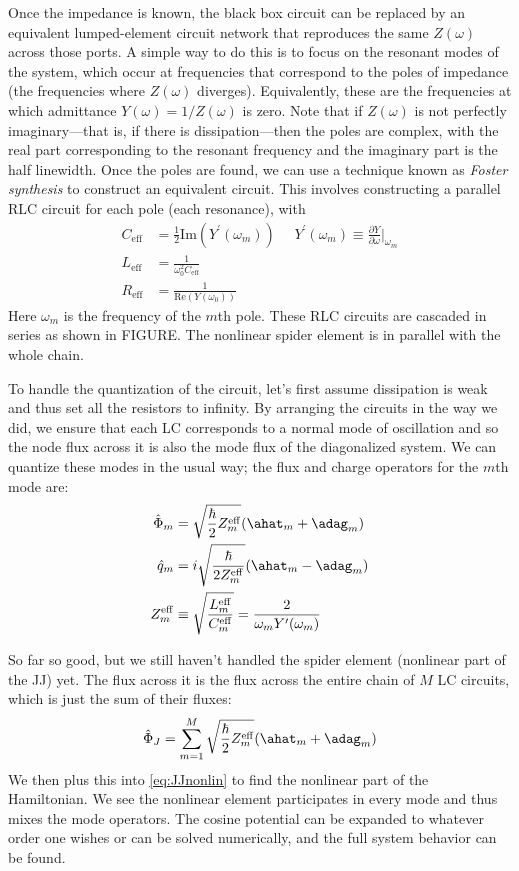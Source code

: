 Once the impedance is known, the black box circuit can be replaced by an equivalent lumped-element circuit network that reproduces the same $Z(\omega)$ across those ports. A simple way to do this is to focus on the resonant modes of the system, which occur at frequencies that correspond to the poles of impedance (the frequencies where $Z(\omega)$ diverges). Equivalently, these are the frequencies at which admittance $Y(\omega) = 1/Z(\omega)$ is zero. Note that if $Z(\omega)$ is not perfectly imaginary---that is, if there is dissipation---then the poles are complex, with the real part corresponding to the resonant frequency and the imaginary part is the half linewidth. Once the poles are found, we can use a technique known as \textit{Foster synthesis} to construct an equivalent circuit. This involves constructing a parallel RLC circuit for each pole (each resonance), with 
\begin{align*}
	C_\mathrm{eff} &= \frac{1}{2} \mathrm{Im}(Y^\prime(\omega_m)) \ \ \ \ \ \ Y^\prime(\omega_m)\equiv \frac{\partial Y}{\partial \omega}\bigg\rvert_{\omega_{m}} \\
	L_\mathrm{eff} &= \frac{1}{\omega_0^2 C_\mathrm{eff}} \\
	R_\mathrm{eff} &= \frac{1}{\mathrm{Re}(Y(\omega_0))}
\end{align*}
Here $\omega_m$ is the frequency of the $m$th pole. These RLC circuits are cascaded in series as shown in FIGURE. The nonlinear spider element is in parallel with the whole chain. 

To handle the quantization of the circuit, let's first assume dissipation is weak and thus set all the resistors to infinity. By arranging the circuits in the way we did, we ensure that each LC corresponds to a normal mode of oscillation and so the node flux across it is also the mode flux of the diagonalized system. We can quantize these modes in the usual way; the flux and charge operators for the $m$th mode are:
\begin{align*}
	\hat{\Phi}_m &= \sqrt{\frac{\hbar}{2} Z^\mathrm{eff}_m} (\ahat_m+\adag_m) \\
	\hat{q}_m &= i\sqrt{\frac{\hbar}{2 Z^\mathrm{eff}_m}} (\ahat_m - \adag_m) \\
	Z^\mathrm{eff}_m &\equiv \sqrt{\frac{L^\mathrm{eff}_m}{C^\mathrm{eff}_m}} = \frac{2}{\omega_m Y^\prime(\omega_m)}
\end{align*}

So far so good, but we still haven't handled the spider element (nonlinear part of the JJ) yet. The flux across it is the flux across the entire chain of $M$ LC circuits, which is just the sum of their fluxes:
\begin{equation*}
	\hat{\Phi}_J = \sum_{m=1}^M \sqrt{\frac{\hbar}{2} Z^\mathrm{eff}_m} (\ahat_m+\adag_m)
\end{equation*}
We then plus this into \cref{eq:JJnonlin} to find the nonlinear part of the Hamiltonian. We see the nonlinear element participates in every mode and thus mixes the mode operators. The cosine potential can be expanded to whatever order one wishes or can be solved numerically, and the full system behavior can be found.

